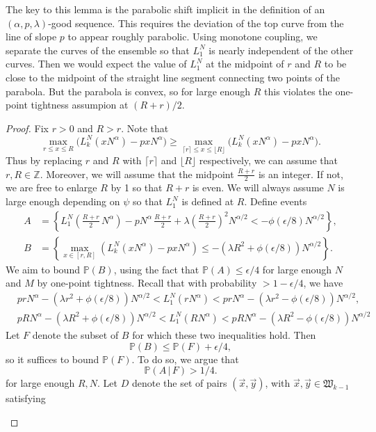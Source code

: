 	\begin{remark}
		The key to this lemma is the parabolic shift implicit in the definition of an $(\alpha,p,\lambda)$-good sequence. This requires the deviation of the top curve from the line of slope $p$ to appear roughly parabolic. Using monotone coupling, we separate the curves of the ensemble so that $L_1^N$ is nearly independent of the other curves. Then we would expect the value of $L_1^N$ at the midpoint of $r$ and $R$ to be close to the midpoint of the straight line segment connecting two points of the parabola. But the parabola is convex, so for large enough $R$ this violates the one-point tightness assumpion at $(R+r)/2$.
	\end{remark}
	
	\begin{proof}
		
		Fix $r>0$ and $R>r$. Note that
		\[
		\max_{r\leq x\leq R} \big(L_k^N(xN^\alpha) - pxN^\alpha\big) \geq \max_{\lceil r\rceil \leq x \leq \lfloor R\rfloor} \big(L_k^N(xN^\alpha) - pxN^\alpha\big).
		\]
		Thus by replacing $r$ and $R$ with $\lceil r\rceil$ and $\lfloor R\rfloor$ respectively, we can assume that $r,R\in\mathbb{Z}$. Moreover, we will assume that the midpoint $\frac{R+r}{2}$ is an integer. If not, we are free to enlarge $R$ by 1 so that $R+r$ is even. We will always assume $N$ is large enough depending on $\psi$ so that $L_1^N$ is defined at $R$. Define events
		\begin{align*}
		A &= \left\{L_1^N\left(\frac{R+r}{2}\,N^\alpha\right) - pN^\alpha\,\frac{R+r}{2} + \lambda\left(\frac{R+r}{2}\right)^2 N^{\alpha/2} < -\phi(\epsilon/8)N^{\alpha/2}\right\},\\
		B &= \left\{\max_{x\in[r,R]} \left(L_k^N(xN^\alpha) - pxN^\alpha\right) \leq -(\lambda R^2 + \phi(\epsilon/8)) N^{\alpha/2} \right\}.
		\end{align*}
		We aim to bound $\mathbb{P}(B)$, using the fact that $\mathbb{P}(A) \leq \epsilon/4$ for large enough $N$ and $M$ by one-point tightness. Recall that with probability $>1-\epsilon/4$, we have 
		\begin{align*}
		& prN^\alpha - (\lambda r^2+\phi(\epsilon/8))N^{\alpha/2} < L_1^N(rN^\alpha) <  prN^\alpha - (\lambda r^2-\phi(\epsilon/8))N^{\alpha/2},\\
		& pRN^\alpha - (\lambda R^2+\phi(\epsilon/8))N^{\alpha/2} < L_1^N(RN^\alpha) <  pRN^\alpha - (\lambda R^2-\phi(\epsilon/8))N^{\alpha/2}
		\end{align*}
		Let $F$ denote the subset of $B$ for which these two inequalities hold. Then 
		\[
		\mathbb{P}(B) \leq \mathbb{P}(F) + \epsilon/4,
		\]
		so it suffices to bound $\mathbb{P}(F)$. To do so, we argue that 
		\[
		\mathbb{P}(A\,|\,F) > 1/4.
		\]
		for large enough $R,N$. Let $D$ denote the set of pairs $(\vec{x},\vec{y})$, with $\vec{x},\vec{y}\in\mathfrak{W}_{k-1}$ satisfying 
		\begin{enumerate}[label=(\arabic*)]
			

\end{enumerate}
\end{proof}
